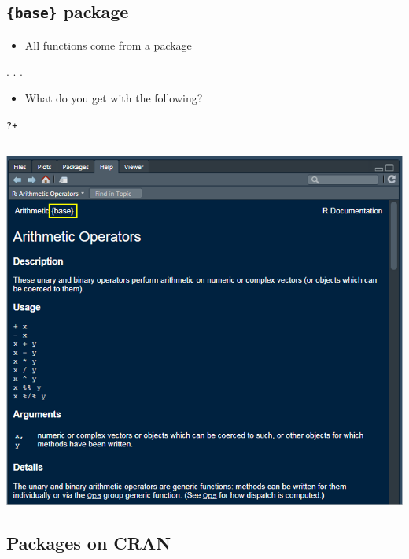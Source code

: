 \documentclass[
  letterpaper,
  DIV=11,
  numbers=noendperiod,
  oneside]{scrartcl}
\providecommand{\tightlist}{%
  \setlength{\itemsep}{0pt}\setlength{\parskip}{0pt}}\usepackage{longtable,booktabs,array}
\begin{document}
\hypertarget{base-package}{%
\subsection{\texorpdfstring{\texttt{\{base\}}
package}{\{base\} package}}\label{base-package}}

\begin{itemize}
\tightlist
\item
  All functions come from a package
\end{itemize}

. . .

\begin{itemize}
\tightlist
\item
  What do you get with the following?
\end{itemize}

\texttt{?\textquotesingle{}+\textquotesingle{}}

\hypertarget{section-6}{%
\subsection{}\label{section-6}}

\includegraphics{./images/plus_help.png}

\hypertarget{packages-on-cran}{%
\subsection{Packages on CRAN}\label{packages-on-cran}}
\end{document}
